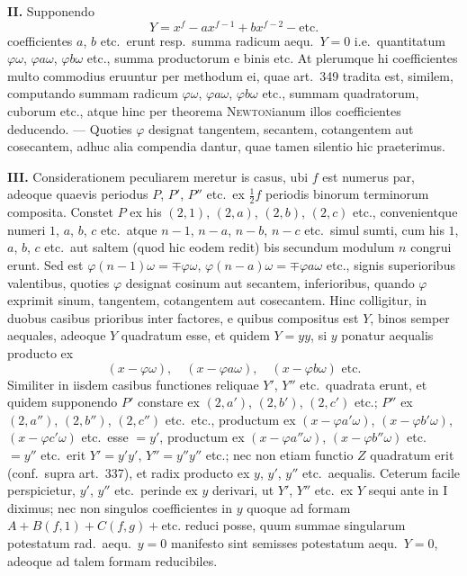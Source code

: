 \documentclass[12pt,a4paper]{article}
\theoremstyle{plain}
\theoremstyle{definition}
\theoremstyle{remark}
\begin{document}
\textbf{II.} Supponendo
\[Y = x^f - ax^{f-1} + bx^{f-2} - \text{etc.}\]
coefficientes $a$, $b$ etc.\ erunt resp.\ summa radicum aequ.\ $Y = 0$ i.e.\ quantitatum $\varphi\omega$, $\varphi a\omega$, $\varphi b\omega$ etc., summa productorum e binis etc. At plerumque hi coefficientes multo commodius eruuntur per methodum ei, quae art.\ 349 tradita est, similem, computando summam radicum $\varphi\omega$, $\varphi a\omega$, $\varphi b\omega$ etc., summam quadratorum, cuborum etc., atque hinc per theorema \textsc{Newton}ianum illos coefficientes deducendo. --- Quoties $\varphi$ designat tangentem, secantem, cotangentem aut cosecantem, adhuc alia compendia dantur, quae tamen silentio hic praeterimus.

\textbf{III.} Considerationem peculiarem meretur is casus, ubi $f$ est numerus par, adeoque quaevis periodus $P$, $P'$, $P''$ etc.\ ex $\tfrac{1}{2}f$ periodis binorum terminorum composita. Constet $P$ ex his $(2,1)$, $(2,a)$, $(2,b)$, $(2,c)$ etc., convenientque numeri $1$, $a$, $b$, $c$ etc.\ atque $n-1$, $n-a$, $n-b$, $n-c$ etc.\ simul sumti, cum his $1$, $a$, $b$, $c$ etc.\ aut saltem (quod hic eodem redit) bis secundum modulum $n$ congrui erunt. Sed est $\varphi(n-1)\omega = \mp\varphi\omega$, $\varphi(n-a)\omega = \mp\varphi a\omega$ etc., signis superioribus valentibus, quoties $\varphi$ designat cosinum aut secantem, inferioribus, quando $\varphi$ exprimit sinum, tangentem, cotangentem aut cosecantem. Hinc colligitur, in duobus casibus prioribus inter factores, e quibus compositus est $Y$, binos semper aequales, adeoque $Y$ quadratum esse, et quidem $Y = yy$, si $y$ ponatur aequalis producto ex
\[(x - \varphi\omega), \quad (x - \varphi a\omega), \quad (x - \varphi b\omega) \text{ etc.}\]
Similiter in iisdem casibus functiones reliquae $Y'$, $Y''$ etc.\ quadrata erunt, et quidem supponendo $P'$ constare ex $(2,a')$, $(2,b')$, $(2,c')$ etc.; $P''$ ex $(2,a'')$, $(2,b'')$, $(2,c'')$ etc.\ etc., productum ex $(x - \varphi a'\omega)$, $(x - \varphi b'\omega)$, $(x - \varphi c'\omega)$ etc.\ esse $= y'$, productum ex $(x - \varphi a''\omega)$, $(x - \varphi b''\omega)$ etc.\ $= y''$ etc.\ erit $Y' = y'y'$, $Y'' = y''y''$ etc.; nec non etiam functio $Z$ quadratum erit (conf.\ supra art.\ 337), et radix producto ex $y$, $y'$, $y''$ etc.\ aequalis. Ceterum facile perspicietur, $y'$, $y''$ etc.\ perinde ex $y$ derivari, ut $Y'$, $Y''$ etc.\ ex $Y$ sequi ante in I diximus; nec non singulos coefficientes in $y$ quoque ad formam $A + B(f,1) + C(f,g) + \text{etc.}$ reduci posse, quum summae singularum potestatum rad.\ aequ.\ $y = 0$ manifesto sint semisses potestatum aequ.\ $Y = 0$, adeoque ad talem formam reducibiles.
\end{document}
